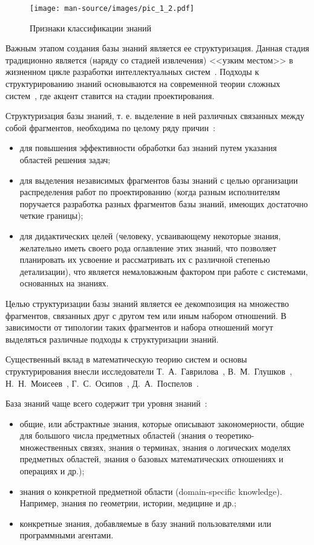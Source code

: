 \begin{figure}[H]
\begin{center}
\texttt{[image: man-source/images/pic\_1\_2.pdf]}\\[2mm]
\caption{Признаки классификации знаний}
\label{pic_1.2}
\end{center}
\end{figure}

Важным этапом создания базы знаний является ее структуризация. Данная стадия традиционно является (наряду со стадией извлечения) <<узким местом>> в жизненном цикле разработки интеллектуальных систем~\cite{Gavrilova2008}. Подходы к структурированию знаний основываются на современной теории сложных систем~\cite{Wasson2005}, где акцент ставится на стадии проектирования. 

Структуризация базы знаний, т. е. выделение в ней различных связанных между собой фрагментов, необходима по целому ряду причин~\cite{Gavrilova2016}:
\begin{itemize}
  \item для повышения эффективности обработки баз знаний путем указания областей решения задач;
  \item для выделения независимых фрагментов базы знаний с целью организации распределения работ по проектированию (когда разным исполнителям поручается разработка разных фрагментов базы знаний, имеющих достаточно четкие границы);
  \item для дидактических целей (человеку, усваивающему некоторые знания, желательно иметь своего рода оглавление этих знаний, что позволяет планировать их усвоение и рассматривать их с различной степенью детализации), что является немаловажным фактором при работе с системами, основанных на знаниях.
\end{itemize}

Целью структуризации базы знаний является ее декомпозиция на множество фрагментов, связанных друг с другом тем или иным набором отношений. В зависимости от типологии таких фрагментов и набора отношений могут выделяться различные подходы к структуризации знаний.

Существенный вклад в математическую теорию систем и основы структурирования внесли исследователи Т.~А.~Гаврилова~\cite{Gavrilova1992},  В.~М.~Глушков~\cite{Glushkov1964}, Н.~Н.~Моисеев~\cite{Moiseev1981}, Г.~С.~Осипов~\cite{Osipov1997, Osipov2015}, Д.~А.~Поспелов~\cite{Pospelov1986}.

База знаний чаще всего содержит три уровня знаний~\cite{Lapshin2010}:
\begin{itemize}
  \item общие, или абстрактные знания, которые описывают закономерности, общие для большого числа предметных областей (знания о теоретико-множественных связях, знания о терминах, знания о логических моделях предметных областей, знания о базовых математических отношениях и операциях и др.);
  \item знания о конкретной предметной области (domain-specific knowledge). Например, знания по геометрии, истории, медицине и др.;
  \item конкретные знания, добавляемые в базу знаний пользователями или программными агентами.
\end{itemize}


